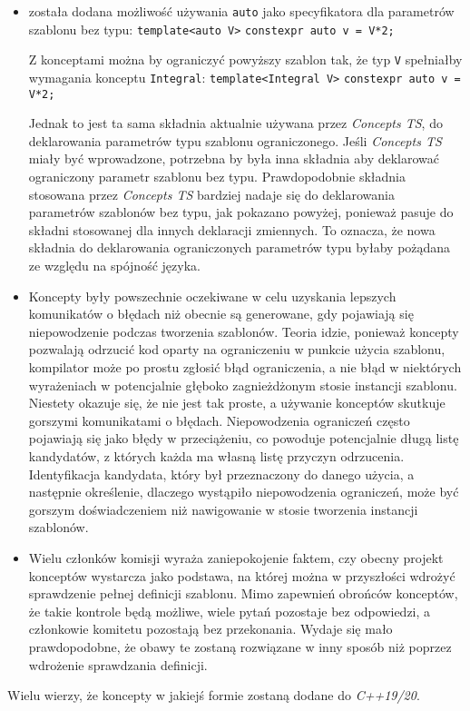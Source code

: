 \documentclass[11pt, a4paper]{article}
\begin{document}
\begin{itemize}
\item została dodana możliwość używania \verb#auto# jako specyfikatora dla parametrów szablonu bez typu: \newline\newline
\verb#template<auto V>#\newline
\verb#constexpr auto v = V*2;#\newline

Z konceptami można by ograniczyć powyższy szablon tak, że typ \verb#V# spełniałby wymagania konceptu \verb#Integral#:\newline
\verb#template<Integral V>#\newline
\verb#constexpr auto v = V*2;#\newline

Jednak to jest ta sama składnia aktualnie używana przez \emph{Concepts TS}, do deklarowania parametrów typu szablonu ograniczonego. Jeśli \emph{Concepts TS} miały być wprowadzone, potrzebna by była inna składnia aby deklarować ograniczony parametr szablonu bez typu. Prawdopodobnie składnia stosowana przez \emph{Concepts TS} bardziej nadaje się do deklarowania parametrów szablonów bez typu, jak pokazano powyżej, ponieważ pasuje do składni stosowanej dla innych deklaracji zmiennych. To oznacza, że nowa składnia do deklarowania ograniczonych parametrów typu byłaby pożądana ze względu na spójność języka.

\item Koncepty były powszechnie oczekiwane w celu uzyskania lepszych komunikatów o błędach niż obecnie są generowane, gdy pojawiają się niepowodzenie podczas tworzenia szablonów. Teoria idzie, ponieważ koncepty pozwalają odrzucić kod oparty na ograniczeniu w punkcie użycia szablonu, kompilator może po prostu zgłosić błąd ograniczenia, a nie błąd w niektórych wyrażeniach w potencjalnie głęboko zagnieżdżonym stosie instancji szablonu. Niestety okazuje się, że nie jest tak proste, a używanie konceptów skutkuje gorszymi komunikatami o błędach. Niepowodzenia ograniczeń często pojawiają się jako błędy w przeciążeniu, co powoduje potencjalnie długą listę kandydatów, z których każda ma własną listę przyczyn odrzucenia. Identyfikacja kandydata, który był przeznaczony do danego użycia, a następnie określenie, dlaczego wystąpiło niepowodzenia ograniczeń, może być gorszym doświadczeniem niż nawigowanie w stosie tworzenia instancji szablonów.

\item Wielu członków komisji wyraża zaniepokojenie faktem, czy obecny projekt konceptów wystarcza jako podstawa, na której można w przyszłości wdrożyć sprawdzenie pełnej definicji szablonu. Mimo zapewnień obrońców konceptów, że takie kontrole będą możliwe, wiele pytań pozostaje bez odpowiedzi, a członkowie komitetu pozostają bez przekonania. Wydaje się mało prawdopodobne, że obawy te zostaną rozwiązane w inny sposób niż poprzez wdrożenie sprawdzania definicji.

\end{itemize}

Wielu wierzy, że koncepty w jakiejś formie zostaną dodane do \emph{C++19/20}.
\end{document}
